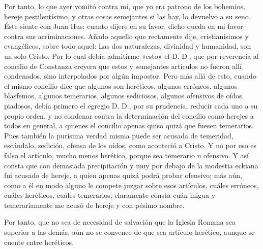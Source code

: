 Por tanto, lo que ayer vomitó contra mí, que yo era patrono de los bohemios, hereje pestilentísimo, y otras cosas semejantes si las hay, lo devuelvo a su seno. Éste siente con Juan Hus; cuanto dijere en su favor, dicho queda en mi favor contra sus acriminaciones. Añado aquello que rectamente dije, cristianísimos y evangélicos, sobre todo aquel: Las dos naturalezas, divinidad y humanidad, son un solo Cristo. Por lo cual debía admitirme «esto» el D. D., que por reverencia al concilio de Constanza creyera que estos y semejantes artículos no fueron allí condenados, sino interpolados por algún impostor. Pero más allá de esto, cuando el mismo concilio dice que algunos son heréticos, algunos erróneos, algunos blasfemos, algunos temerarios, algunos sediciosos, algunos ofensivos de oídos piadosos, debía primero el egregio D. D., por su prudencia, reducir cada uno a su propio orden, y no condenar contra la determinación del concilio como herejes a todos en general, a quienes el concilio apenas quiso quizá que fuesen temerarios. Pues también la purísima verdad misma puede ser acusada de temeridad, escándalo, sedición, ofensa de los oídos, como aconteció a Cristo. Y no por eso es falso el artículo, mucho menos herético, porque sea temerario u ofensivo. Y así consta que con demasiada precipitación y muy por debajo de la modestia eckiana fui acusado de hereje, a quien apenas quizá podrá probar ofensivo; más aún, como a él en modo alguno le compete juzgar sobre esos artículos, cuáles erróneos, cuáles heréticos, cuáles temerarios, claramente consta cuán inigua y temerariamente me acusó de hereje y con pésimo nombre.

Por tanto, que no sea de necesidad de salvación que la Iglesia Romana sea superior a las demás, aún no se convence de que sea artículo herético, aunque se cuente entre heréticos.


